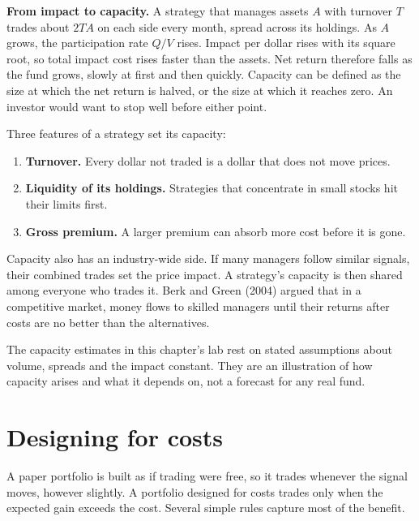 \textbf{From impact to capacity.} A strategy that manages assets $A$ with turnover $T$ trades about $2TA$ on each side every month, spread across its holdings. As $A$ grows, the participation rate $Q/V$ rises. Impact per dollar rises with its square root, so total impact cost rises faster than the assets. Net return therefore falls as the fund grows, slowly at first and then quickly. Capacity can be defined as the size at which the net return is halved, or the size at which it reaches zero. An investor would want to stop well before either point.

Three features of a strategy set its capacity:

\begin{enumerate}
  \item \textbf{Turnover.} Every dollar not traded is a dollar that does not move prices.
  \item \textbf{Liquidity of its holdings.} Strategies that concentrate in small stocks hit their limits first.
  \item \textbf{Gross premium.} A larger premium can absorb more cost before it is gone.
\end{enumerate}

Capacity also has an industry-wide side. If many managers follow similar signals, their combined trades set the price impact. A strategy's capacity is then shared among everyone who trades it. Berk and Green (2004) argued that in a competitive market, money flows to skilled managers until their returns after costs are no better than the alternatives.

The capacity estimates in this chapter's lab rest on stated assumptions about volume, spreads and the impact constant. They are an illustration of how capacity arises and what it depends on, not a forecast for any real fund.

\section{Designing for costs}
\label{sec:17-design}

A paper portfolio is built as if trading were free, so it trades whenever the signal moves, however slightly. A portfolio designed for costs trades only when the expected gain exceeds the cost. Several simple rules capture most of the benefit.

